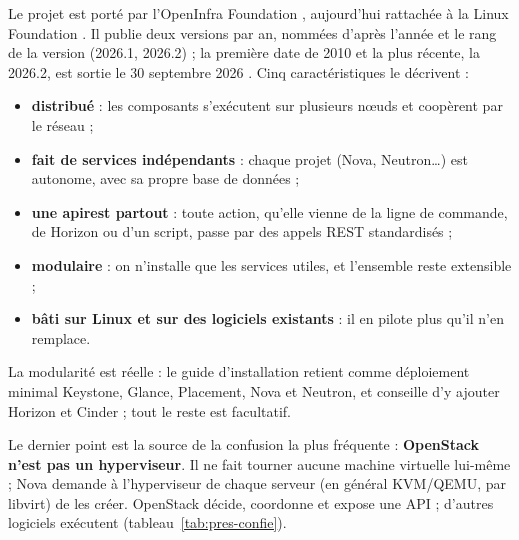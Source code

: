 Le projet est porté par l'OpenInfra Foundation \parencite{openstack-site}, aujourd'hui rattachée à la Linux Foundation
\parencite{openinfra-lf}. Il publie deux versions par an, nommées d'après l'année et le rang de la version (2026.1, 2026.2) ; la
première date de 2010 et la plus récente, la 2026.2, est sortie le 30 septembre 2026 \parencite{openstack-releases}. Cinq
caractéristiques le décrivent :

\begin{itemize}
  \item \textbf{distribué} : les composants s'exécutent sur plusieurs nœuds et coopèrent par le réseau ;
  \item \textbf{fait de services indépendants} : chaque projet (Nova, Neutron\dots) est autonome, avec sa propre base de données ;
  \item \textbf{une \gls{apirest} partout} : toute action, qu'elle vienne de la ligne de commande, de Horizon ou d'un script, passe par
        des appels REST standardisés ;
  \item \textbf{modulaire} : on n'installe que les services utiles, et l'ensemble reste extensible ;
  \item \textbf{bâti sur Linux et sur des logiciels existants} : il en pilote plus qu'il n'en remplace.
\end{itemize}

La modularité est réelle : le guide d'installation retient comme déploiement minimal Keystone, Glance, Placement, Nova et Neutron, et
conseille d'y ajouter Horizon et Cinder \parencite{install-services} ; tout le reste est facultatif.

Le dernier point est la source de la confusion la plus fréquente : \textbf{OpenStack n'est pas un hyperviseur}. Il ne fait tourner
aucune machine virtuelle lui-même ; Nova demande à l'hyperviseur de chaque serveur (en général KVM/QEMU, par \gls{libvirt}) de les
créer. OpenStack décide, coordonne et expose une API ; d'autres logiciels exécutent (tableau~\ref{tab:pres-confie}).

